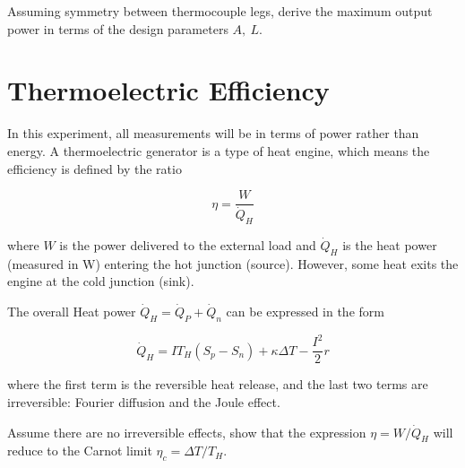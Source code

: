 \documentclass[
  letterpaper,
  DIV=11,
  numbers=noendperiod]{scrreprt}
\begin{document}
\begin{tcolorbox}[enhanced jigsaw, toprule=.15mm, coltitle=black, bottomrule=.15mm, colbacktitle=quarto-callout-tip-color!10!white, opacitybacktitle=0.6, titlerule=0mm, colframe=quarto-callout-tip-color-frame, title=\textcolor{quarto-callout-tip-color}{\faLightbulb}\hspace{0.5em}{Question 6}, leftrule=.75mm, bottomtitle=1mm, breakable, opacityback=0, arc=.35mm, left=2mm, colback=white, rightrule=.15mm, toptitle=1mm]

Assuming symmetry between thermocouple legs, derive the maximum output
power in terms of the design parameters \(A,\ L\).

\end{tcolorbox}

\hypertarget{thermoelectric-efficiency}{%
\section{Thermoelectric Efficiency}\label{thermoelectric-efficiency}}

In this experiment, all measurements will be in terms of power rather
than energy. A thermoelectric generator is a type of heat engine, which
means the efficiency is defined by the ratio

\[\eta = \frac{W}{\dot{Q}_{H}}\]

where \(W\) is the power delivered to the external load and
\(\dot{Q}_{H}\) is the heat power (measured in W) entering the hot
junction (source). However, some heat exits the engine at the cold
junction (sink).

The overall Heat power \(\dot{Q}_{H} = \dot{Q}_{P} + \dot{Q}_{n}\) can
be expressed in the form

\[\dot{Q}_{H}= IT_{H}\left( S_{p} - S_{n} \right) + \kappa\Delta T - \frac{I^{2}}{2}r\]

where the first term is the reversible heat release, and the last two
terms are irreversible: Fourier diffusion and the Joule effect.

\begin{tcolorbox}[enhanced jigsaw, toprule=.15mm, coltitle=black, bottomrule=.15mm, colbacktitle=quarto-callout-tip-color!10!white, opacitybacktitle=0.6, titlerule=0mm, colframe=quarto-callout-tip-color-frame, title=\textcolor{quarto-callout-tip-color}{\faLightbulb}\hspace{0.5em}{Question 7 (Advanced)}, leftrule=.75mm, bottomtitle=1mm, breakable, opacityback=0, arc=.35mm, left=2mm, colback=white, rightrule=.15mm, toptitle=1mm]

Assume there are no irreversible effects, show that the expression
\(\eta = W/\dot{Q}_{H}\) will reduce to the Carnot limit
\(\eta_{c} = \Delta T/T_{H}\).

\end{tcolorbox}
\end{document}
